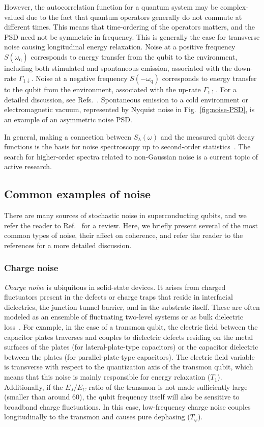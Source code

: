 \documentclass[aip,apr,twocolumn,showpacs,superscriptaddress,groupedaddress,nofootinbib,reprint]{revtex4-1}  %
\newcommand{\freq}{\omega_\text{q}}
\begin{document}
However, the autocorrelation function for a quantum system may be complex-valued due to the fact that quantum operators generally do not commute at different times. This means that time-ordering of the operators matters, and the PSD need not be symmetric in frequency. This is generally the case for transverse noise causing longitudinal energy relaxation. Noise at a positive frequency $S(\freq)$ corresponds to energy transfer from the qubit to the environment, including both stimulated and spontaneous emission, associated with the down-rate $\Gamma_{1\downarrow}$. Noise at a negative frequency $S(-\freq)$ corresponds to energy transfer to the qubit from the environment, associated with the up-rate $\Gamma_{1\uparrow}$. For a detailed discussion, see Refs.~. Spontaneous emission to a cold environment or electromagnetic vacuum, represented by Nyquist noise in Fig.~\ref{fig:noise-PSD}, is an example of an asymmetric noise PSD\cite{Nyquist1928}.

In general, making a connection between $S_{\lambda}(\omega)$ and the measured qubit decay functions is the basis for noise spectroscopy up to second-order statistics~\cite{Bylander2011,Gustavsson2011,Yoshihara2014,Yan2012,Yan2013}. The search for higher-order spectra related to non-Gaussian noise is a current topic of active research\cite{Sung2019}.

\subsection{Common examples of noise}

There are many sources of stochastic noise in superconducting qubits, and we refer the reader to Ref.~ for a review. Here, we briefly present several of the most common types of noise, their affect on coherence, and refer the reader to the references for a more detailed discussion.

\subsubsection{Charge noise}
\textit{Charge noise} is ubiquitous in solid-state devices. It arises from charged fluctuators present in the defects or charge traps that reside in interfacial dielectrics, the junction tunnel barrier, and in the substrate itself. These are often modeled as an ensemble of fluctuating two-level systems or as bulk dielectric loss~\cite{Wang2015,Dial2016}. For example, in the case of a transmon qubit, the electric field between the capacitor plates traverses and couples to dielectric defects residing on the metal surfaces of the plates (for lateral-plate-type capacitors) or the capacitor dielectric between the plates (for parallel-plate-type capacitors). The electric field variable is transverse with respect to the quantization axis of the transmon qubit, which means that this noise is mainly responsible for energy relaxation ($T_1$). Additionally, if the $E_J/E_C$ ratio of the transmon is not made sufficiently large (smaller than around 60), the qubit frequency itself will also be sensitive to broadband charge fluctuations. In this case, low-frequency charge noise couples longitudinally to the transmon and causes pure dephasing ($T_{\varphi}$).
\end{document}

